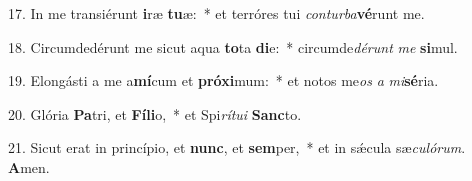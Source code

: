 17. In me transiérunt \textbf{i}ræ \textbf{tu}æ:~*  et terróres tui \textit{con}\textit{tur}\textit{ba}\textbf{vé}runt me.\

18. Circumdedérunt me sicut aqua \textbf{to}ta \textbf{di}e:~*  circumde\textit{dé}\textit{runt} \textit{me} \textbf{si}mul.\

19. Elongásti a me a\textbf{mí}cum et \textbf{pró}\textbf{xi}mum:~*  et notos me\textit{os} \textit{a} \textit{mi}\textbf{sé}ria.\

20. Glória \textbf{Pa}tri, et \textbf{Fí}\textbf{li}o,~*  et Spi\textit{rí}\textit{tu}\textit{i} \textbf{Sanc}to.\

21. Sicut erat in princípio, et \textbf{nunc}, et \textbf{sem}per,~*  et in sǽcula sæ\textit{cu}\textit{ló}\textit{rum}. \textbf{A}men.\

